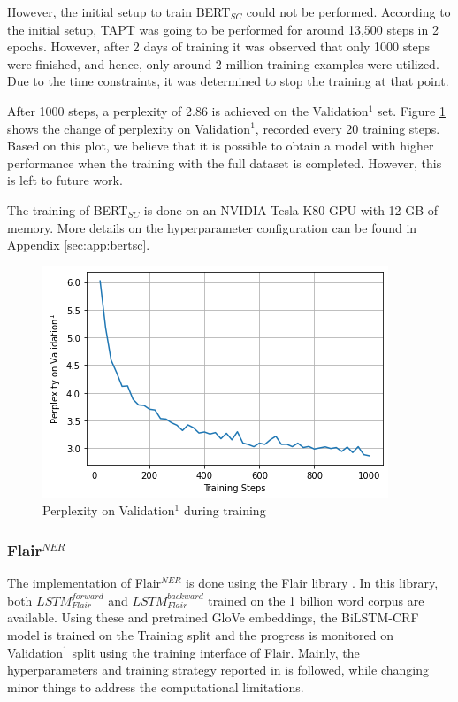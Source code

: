 \documentclass{report}
\theoremstyle{definition}
\theoremstyle{remark}
\begin{document}
However, the initial setup to train BERT$_{SC}$ could not be performed. According to the initial setup, TAPT was going to be performed for around 13,500 steps in 2 epochs. However, after 2 days of training it was observed that only 1000 steps were finished, and hence, only around 2 million training examples were utilized. Due to the time constraints, it was determined to stop the training at that point. 

After 1000 steps, a perplexity of 2.86 is achieved on the Validation$^1$ set. Figure \ref{fig:perp} shows the change of perplexity on Validation$^1$, recorded every 20 training steps. Based on this plot, we believe that it is possible to obtain a model with higher performance when the training with the full dataset is completed. However, this is left to future work.

The training of BERT$_{SC}$ is done on an NVIDIA Tesla K80 GPU with 12 GB of memory. More details on the hyperparameter configuration can be found in Appendix \ref{sec:app:bertsc}.

\begin{figure}
    \centering
    \includegraphics[scale=0.7]{perpplot.png}
    \caption{Perplexity on Validation$^1$ during training}
    \label{fig:perp}
\end{figure}

\subsubsection{Flair$^{NER}$}
The implementation of Flair$^{NER}$ is done using the Flair library \cite{flairlib}. In this library, both $LSTM^{forward}_{Flair}$ and $LSTM^{backward}_{Flair}$ trained on the 1 billion word corpus \cite{onebillion} are available. Using these and pretrained GloVe embeddings, the BiLSTM-CRF model is trained on the Training split and the progress is monitored on Validation$^1$ split using the training interface of Flair.  Mainly, the hyperparameters and training strategy reported in \cite{flairpaper} is followed, while changing minor things to address the computational limitations. 
\end{document}

